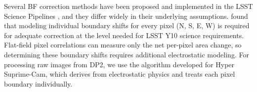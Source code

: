 Several BF correction methods have been proposed and implemented in the LSST Science Pipelines \citep{2015JInst..10C5032G,2018AJ....155..258C,2023A&A...670A.118A,2024PASP..136d5003B}, and they differ widely in their underlying assumptions.
\citet{2024PASP..136d5003B} found that modeling individual boundary shifts for every pixel (N, S, E, W) is required for adequate correction at the level needed for LSST Y10 science requirements.
Flat-field pixel correlations can measure only the net per-pixel area change, so determining these boundary shifts requires additional electrostatic modeling.
For processing raw images from DP2, we use the \citet{2023A&A...670A.118A} algorithm developed for Hyper Suprime-Cam, which derives from electrostatic physics and treats each pixel boundary individually.


